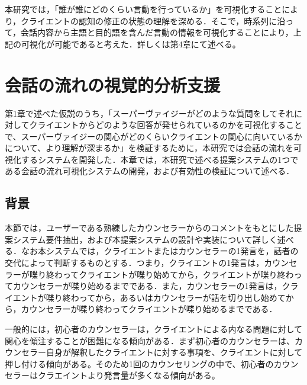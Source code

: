 \documentclass[shuuron]{kuee}
\begin{document}

本研究では，「誰が誰にどのくらい言動を行っているか」を可視化することにより，クライエントの認知の修正の状態の理解を深める．そこで，時系列に沿って，会話内容から主語と目的語を含んだ言動の情報を可視化することにより，上記の可視化が可能であると考えた．詳しくは第4章にて述べる。



\chapter{会話の流れの視覚的分析支援}

第1章で述べた仮説のうち，「スーパーヴァイジーがどのような質問をしてそれに対してクライエントからどのような回答が発せられているのかを可視化することで、スーパーヴァイジーの関心がどのくらいクライエントの関心に向いているかについて、より理解が深まるか」を検証するために，本研究では会話の流れを可視化するシステムを開発した．本章では，本研究で述べる提案システムの1つである会話の流れ可視化システムの開発，および有効性の検証について述べる．
\section{背景}


本節では，ユーザーである熟練したカウンセラーからのコメントをもとにした提案システム要件抽出，および本提案システムの設計や実装について詳しく述べる．なお本システムでは，クライエントまたはカウンセラーの1発言を，話者の交代によって判断するものとする．つまり，クライエントの1発言は，カウンセラーが喋り終わってクライエントが喋り始めてから，クライエントが喋り終わってカウンセラーが喋り始めるまでである．また，カウンセラーの1発言は，クライエントが喋り終わってから，あるいはカウンセラーが話を切り出し始めてから，カウンセラーが喋り終わってクライエントが喋り始めるまでである．


一般的には，初心者のカウンセラーは，クライエントによる内なる問題に対して関心を傾注することが困難になる傾向がある．まず初心者のカウンセラーは、カウンセラー自身が解釈したクライエントに対する事項を、クライエントに対して押し付ける傾向がある。そのため1回のカウンセリングの中で、初心者のカウンセラーはクラエイントより発言量が多くなる傾向がある。
\end{document}
